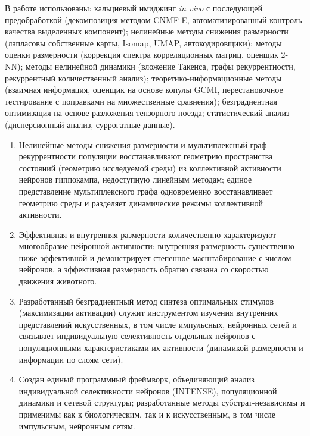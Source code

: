 {\methods} В работе использованы: кальциевый имиджинг \textit{in vivo}
с последующей предобработкой (декомпозиция методом CNMF-E, автоматизированный
контроль качества выделенных компонент); нелинейные методы снижения
размерности (лапласовы собственные карты, Isomap, UMAP, автокодировщики);
методы оценки размерности (коррекция спектра корреляционных матриц, оценщик
2-NN); методы нелинейной динамики (вложение Такенса, графы рекуррентности,
рекуррентный количественный анализ); теоретико-информационные методы
(взаимная информация, оценщик на основе копулы GCMI, перестановочное
тестирование с поправками на множественные сравнения); безградиентная
оптимизация на основе разложения тензорного поезда; статистический анализ
(дисперсионный анализ, суррогатные данные).


{}
\begin{enumerate}[beginpenalty=10000]
  \item Нелинейные методы снижения размерности и мультиплексный граф
  рекуррентности популяции восстанавливают геометрию пространства состояний
  (геометрию исследуемой среды) из коллективной активности нейронов гиппокампа,
  недоступную линейным методам; единое представление мультиплексного графа
  одновременно восстанавливает геометрию среды и разделяет динамические режимы
  коллективной активности.
  \item Эффективная и внутренняя размерности количественно характеризуют
  многообразие нейронной активности: внутренняя размерность существенно ниже
  эффективной и демонстрирует степенное масштабирование с числом нейронов,
  а эффективная размерность обратно связана со скоростью движения животного.
  \item Разработанный безградиентный метод синтеза оптимальных стимулов
  (максимизации активации) служит инструментом изучения внутренних представлений
  искусственных, в том числе импульсных, нейронных сетей и связывает
  индивидуальную селективность отдельных нейронов с популяционными
  характеристиками их активности (динамикой размерности и информации по слоям
  сети).
  \item Создан единый программный фреймворк, объединяющий анализ индивидуальной
  селективности нейронов (INTENSE), популяционной динамики и сетевой структуры;
  разработанные методы субстрат-независимы и применимы как к биологическим, так
  и к искусственным, в том числе импульсным, нейронным сетям.
\end{enumerate}


